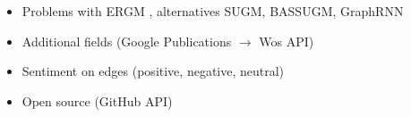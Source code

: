 \begin{itemize}
\item Problems with ERGM \citep{bhamidi2008,chatterjee2011}, alternatives SUGM, BASSUGM, GraphRNN
\item Additional fields (Google Publications $\rightarrow$ Wos API)
\item Sentiment on edges (positive, negative, neutral)
\item Open source (GitHub API)
\end{itemize}